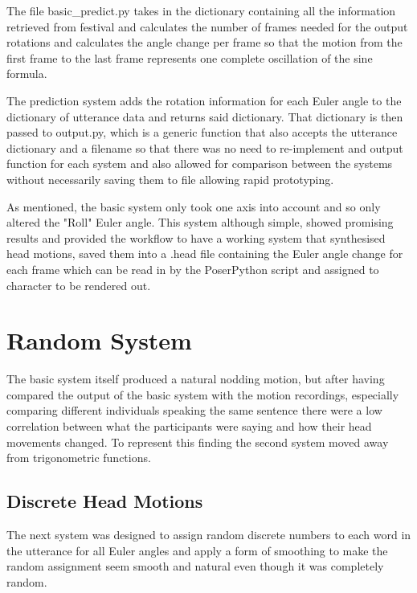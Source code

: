 \documentclass[bsc,frontabs,twoside,singlespacing,parskip]{infthesis}
\begin{document}
The file basic\_predict.py takes in the dictionary containing all the information retrieved from festival and calculates the number of frames needed for the output rotations and calculates the angle change per frame so that the motion from the first frame to the last frame represents one complete oscillation of the sine formula.

The prediction system adds the rotation information for each Euler angle to the dictionary of utterance data and returns said dictionary. That dictionary is then passed to output.py, which is a generic function that also accepts the utterance dictionary and a filename so that there was no need to re-implement and output function for each system and also allowed for comparison between the systems without necessarily saving them to file allowing rapid prototyping.


As mentioned, the basic system only took one axis into account and so only altered the "Roll" Euler angle. This system although simple, showed promising results and provided the workflow to have a working system that synthesised head motions, saved them into a .head file containing the Euler angle change for each frame which can be read in by the PoserPython script and assigned to character to be rendered out.

\section{Random System}

The basic system itself produced a natural nodding motion, but after having compared the output of the basic system with the motion recordings, especially comparing different individuals speaking the same sentence there were a low correlation between what the participants were saying and how their head movements changed. To represent this finding the second system moved away from trigonometric functions.

\subsection{Discrete Head Motions}

The next system was designed to assign random discrete numbers to each word in the utterance for all Euler angles and apply a form of smoothing to make the random assignment seem smooth and natural even though it was completely random. 
\end{document}
